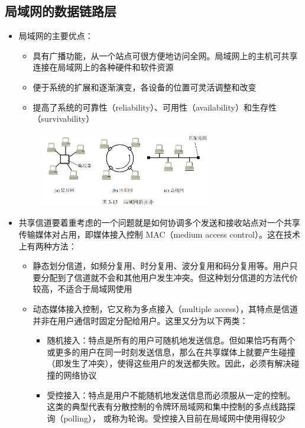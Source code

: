 \documentclass[cs4size,a4paper,10pt]{ctexart}
\begin{document}
	\subsection{局域网的数据链路层}
	\begin{itemize}
		\item 局域网的主要优点：
		\begin{itemize}
			\item 具有广播功能，从一个站点可很方便地访问全网。局域网上的主机可共享连接在局域网上的各种硬件和软件资源
			\item 便于系统的扩展和逐渐演变，各设备的位置可灵活调整和改变
			\item 提高了系统的可靠性（reliability）、可用性（availability）和生存性（survivability）
		\end{itemize}
		\begin{figure}[H]
			\centering
			\includegraphics[width=0.7\textwidth]{img/3.13}
		\end{figure}
		\item 共享信道要着重考虑的一个问题就是如何协调多个发送和接收站点对一个共享传输媒体对占用，即媒体接入控制 MAC（medium access control）。这在技术上有两种方法：
		\begin{itemize}
			\item 静态划分信道，如频分复用、时分复用、波分复用和码分复用等。用户只要分配到了信道就不会和其他用户发生冲突。但这种划分信道的方法代价较高，不适合于局域网使用
			\item 动态媒体接入控制，它又称为多点接入（multiple access），其特点是信道并非在用户通信时固定分配给用户。这里又分为以下两类：
			\begin{itemize}
				\item 随机接入：特点是所有的用户可随机地发送信息。但如果恰巧有两个或更多的用户在同一时刻发送信息，那么在共享媒体上就要产生碰撞（即发生了冲突），使得这些用户的发送都失败。因此，必须有解决碰撞的网络协议
				\item 受控接入：特点是用户不能随机地发送信息而必须服从一定的控制。这类的典型代表有分散控制的令牌环局域网和集中控制的多点线路探询（polling）， 或称为轮询。受控接入目前在局域网中使用得较少
			\end{itemize}
		\end{itemize}
	\end{itemize}
\end{document}
